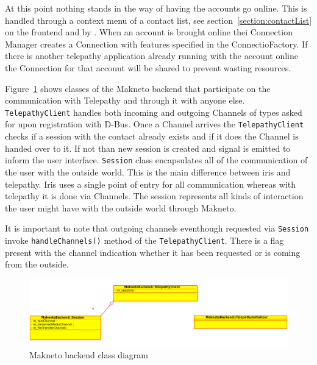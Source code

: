 At this point nothing stands in the way of having the accounts go online. This is handled through a context menu of a contact list, see section~\ref{section:contactList} on the frontend and by . When an account is brought online thei Connection Manager creates a Connection with features specified in the ConnectioFactory. If there is another telepathy application already running with the account online the Connection for that account will be shared to prevent wasting resources. 

Figure~\ref{fig:MaknetoBackendClassDiag} shows classes of the Makneto backend that participate on the communication with Telepathy and through it with anyone else. \verb|TelepathyClient| handles both incoming and outgoing  Channels of types asked for upon registration with D-Bus. Once a Channel arrives the \verb|TelepathyClient| checks if a session with the contact already exists and if it does the Channel is handed over to it. If not than new session is created and signal is emitted to inform the user interface. \verb|Session| class encapsulates all of the communication of the user with the outside world. This is the main difference between iris and telepathy. Iris uses a single point of entry for all communication whereas with telepathy it is done via Channels. The session represents all kinds of interaction the user might have with the outside world through Makneto. 

It is important to note that outgoing channels eventhough requested via \verb|Session| invoke \verb|handleChannels()| method of the \verb|TelepathyClient|. There is a flag present with the channel indication whether it has been requested or is coming from the outside. 

\begin{figure}[ht]
	\begin{center}
	\includegraphics[width=15cm]{fig/makneto-backend-class-diag.pdf}
	\caption{Makneto backend class diagram}
	\label{fig:MaknetoBackendClassDiag}
\end{center}
\end{figure}

